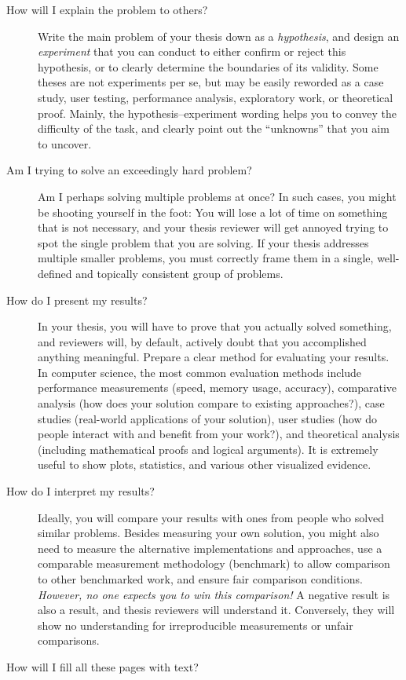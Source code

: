 \begin{description}
\item[How will I explain the problem to others?]
Write the main problem of your thesis down as a \emph{hypothesis}, and design an \emph{experiment} that you can conduct to either confirm or reject this hypothesis, or to clearly determine the boundaries of its validity. Some theses are not experiments per se, but may be easily reworded as a case study, user testing, performance analysis, exploratory work, or theoretical proof. Mainly, the hypothesis--experiment wording helps you to convey the difficulty of the task, and clearly point out the ``unknowns'' that you aim to uncover.
\item[Am I trying to solve an exceedingly hard problem?]
Am I perhaps solving multiple problems at once? In such cases, you might be shooting yourself in the foot: You will lose a lot of time on something that is not necessary, and your thesis reviewer will get annoyed trying to spot the single problem that you are solving. If your thesis addresses multiple smaller problems, you must correctly frame them in a single, well-defined and topically consistent group of problems.
\item[How do I present my results?]
In your thesis, you will have to prove that you actually solved something, and reviewers will, by default, actively doubt that you accomplished anything meaningful. Prepare a clear method for evaluating your results. In computer science, the most common evaluation methods include performance measurements (speed, memory usage, accuracy), comparative analysis (how does your solution compare to existing approaches?), case studies (real-world applications of your solution), user studies (how do people interact with and benefit from your work?), and theoretical analysis (including mathematical proofs and logical arguments). It is extremely useful to show plots, statistics, and various other visualized evidence.
\item[How do I interpret my results?]
Ideally, you will compare your results with ones from people who solved similar problems. Besides measuring your own solution, you might also need to measure the alternative implementations and approaches, use a comparable measurement methodology (benchmark) to allow comparison to other benchmarked work, and ensure fair comparison conditions. \emph{However, no one expects you to win this comparison!} A negative result is also a result, and thesis reviewers will understand it. Conversely, they will show no understanding for irreproducible measurements or unfair comparisons.
\item[How will I fill all these pages with text?]

\end{description}
